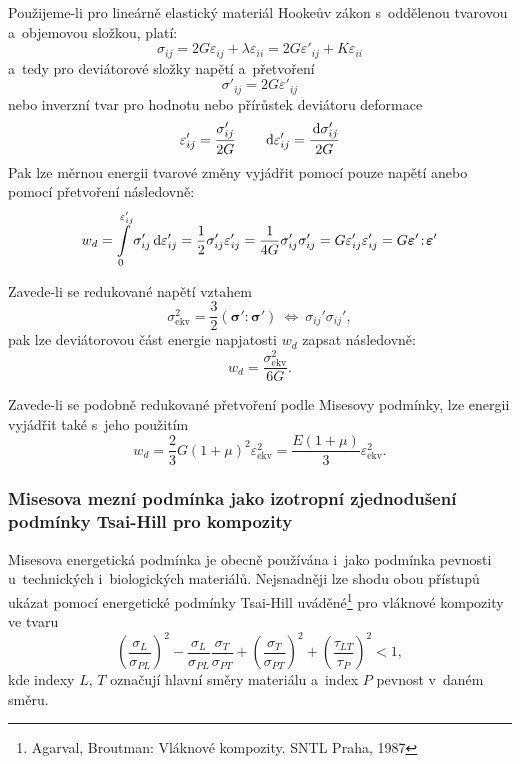 Použijeme-li pro lineárně elastický materiál Hookeův zákon s~oddělenou tvarovou a~objemovou složkou, platí:
\begin{equation}
	\sigma_{ij}
	= 2 G \varepsilon_{ij} + \lambda \varepsilon_{ii}
	= 2 G \varepsilon'_{ij} + K \varepsilon_{ii}
\end{equation}
a~tedy pro deviátorové složky napětí a~přetvoření
\begin{equation}
	\sigma'_{ij} = 2 G \varepsilon'_{ij}
\end{equation}
nebo inverzní tvar pro hodnotu nebo přírůstek deviátoru deformace
\begin{equation}
	\varepsilon'_{ij} = \frac{\sigma'_{ij}}{2 G} \qquad
	\,\mathrm{d}\varepsilon'_{ij} = \frac{\,\mathrm{d} \sigma'_{ij}}{2 G}
\end{equation}
Pak lze měrnou energii tvarové změny vyjádřit pomocí pouze napětí anebo pomocí přetvoření následovně:
\begin{equation}
	w_d
	= \int\limits_0^{\varepsilon'_{ij}} \sigma'_{ij} \,\mathrm{d} \varepsilon'_{ij}
	= \frac{1}{2} \sigma'_{ij} \varepsilon'_{ij}
	= \frac{1}{4 G} \sigma'_{ij} \sigma'_{ij}
	= G \varepsilon'_{ij} \varepsilon'_{ij}
	= G \bm{\varepsilon}' \!:\! \bm{\varepsilon}'
\end{equation}

Zavede-li se redukované napětí vztahem
\begin{equation}
	\sigma_\text{ekv}^2
	= \frac{3}{2} (\bm{\sigma}' \!:\! \bm{\sigma}')
	\:\Leftrightarrow\: \sigma_{ij}' \sigma_{ij}',
\end{equation}
pak lze deviátorovou část energie napjatosti $w_d$ zapsat následovně:
\begin{equation}
	w_d = \frac{\sigma_\text{ekv}^2}{6 G}.
\end{equation}

Zavede-li se podobně redukované přetvoření podle Misesovy podmínky, lze energii vyjádřit také s~jeho použitím
\begin{equation}
	w_d
	= \frac{2}{3} G (1+\mu)^2 \varepsilon_\text{ekv}^2
	= \frac{E (1+\mu)}{3} \varepsilon_\text{ekv}^2.
\end{equation}

\subsubsection{Misesova mezní podmínka jako izotropní zjednodušení podmínky Tsai-Hill pro kompozity}
Misesova energetická podmínka je obecně používána i~jako podmínka pevnosti u~technických i~biologických materiálů.
Nejsnadněji lze shodu obou přístupů ukázat pomocí energetické podmínky Tsai-Hill uváděné\footnote{Agarval, Broutman: Vláknové kompozity. SNTL Praha, 1987} pro vláknové kompozity ve tvaru
\begin{equation}
	\left(\frac{\sigma_L}{\sigma_{PL}}\right)^2
	- \frac{\sigma_L}{\sigma_{PL}} \frac{\sigma_T}{\sigma_{PT}}
	+ \left(\frac{\sigma_T}{\sigma_{PT}}\right)^2
	+ \left(\frac{\tau_{LT}}{\tau_P}\right)^2 < 1,
\end{equation}
kde indexy $L$, $T$ označují hlavní směry materiálu a~index $P$ pevnost v~daném směru.

